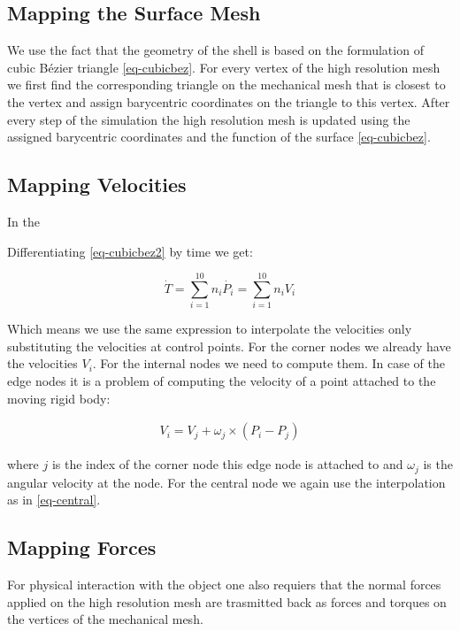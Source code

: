 \documentclass{egpubl}
\begin{document}
\subsection{Mapping the Surface Mesh}

We use the fact that the geometry of the shell is based on the formulation
of cubic Bézier triangle \eqref{eq-cubicbez}. For every vertex of the high
resolution mesh we first find the corresponding triangle on the mechanical
mesh that is closest to the vertex and assign barycentric coordinates on
the triangle to this vertex. After every step of the simulation the high
resolution mesh is updated using the assigned barycentric coordinates and
the function of the surface \eqref{eq-cubicbez}.

\subsection{Mapping Velocities}

In the 

Differentiating \eqref{eq-cubicbez2} by time we get:

\begin{equation}
    \dot{T} = \sum_{i=1}^{10} n_i \dot{P_i} = \sum_{i=1}^{10} n_i V_i
\end{equation}

Which means we use the same expression to interpolate the velocities only
substituting the velocities at control points. For the corner nodes we
already have the velocities $V_i$. For the internal nodes we need to compute
them. In case of the edge nodes it is a problem of computing the velocity
of a point attached to the moving rigid body:

\begin{eqnarray}
    V_i = V_j + \omega_j \times (P_i - P_j)
\end{eqnarray}

where $j$ is the index of the corner node this edge node is attached to and
$\omega_j$ is the angular velocity at the node. For the central node we
again use the interpolation as in \eqref{eq-central}.

\subsection{Mapping Forces}

For physical interaction with the object one also requiers that the normal
forces applied on the high resolution mesh are trasmitted back as forces
and torques on the vertices of the mechanical mesh.
\end{document}
